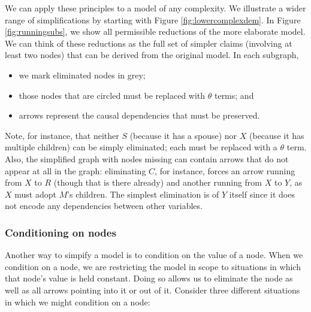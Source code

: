 \documentclass[
  12pt,
]{book}
\providecommand{\tightlist}{%
  \setlength{\itemsep}{0pt}\setlength{\parskip}{0pt}}
\begin{document}
We can apply these principles to a model of any complexity. We illustrate a wider range of simplifications by starting with Figure \ref{fig:lowercomplexdem}. In Figure \ref{fig:runningsubs}, we show all permissible reductions of the more elaborate model. We can think of these reductions as the full set of simpler claims (involving at least two nodes) that can be derived from the original model. In each subgraph,

\begin{itemize}
\tightlist
\item
  we mark eliminated nodes in grey;
\item
  those nodes that are circled must be replaced with \(\theta\) terms; and
\item
  arrows represent the causal dependencies that must be preserved.
\end{itemize}

Note, for instance, that neither \(S\) (because it has a spouse) nor \(X\) (because it has multiple children) can be simply eliminated; each must be replaced with a \(\theta\) term. Also, the simplified graph with nodes missing can contain arrows that do not appear at all in the graph: eliminating \(C\), for instance, forces an arrow running from \(X\) to \(R\) (though that is there already) and another running from \(X\) to \(Y\), as \(X\) must adopt \(M\)'s children. The simplest elimination is of \(Y\) itself since it does not encode any dependencies between other variables.

\hypertarget{conditioning-on-nodes}{%
\subsubsection{Conditioning on nodes}\label{conditioning-on-nodes}}

Another way to simpify a model is to condition on the value of a node. When we condition on a node, we are restricting the model in scope to situations in which that node's value is held constant. Doing so allows us to eliminate the node as well as all arrows pointing into it or out of it. Consider three different situations in which we might condition on a node:
\end{document}
